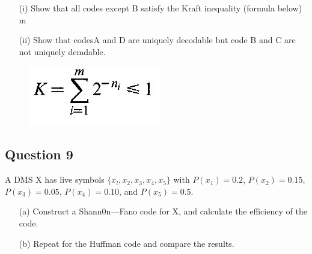 \documentclass[a4paper,12pt]{article}
\begin{document}
\begin{itemize}
\item[(i)] Show that all codes except B satisfy the Kraft inequality (formula below)
m
\item[(ii)] Show that codesA and D are uniquely decodable but code B and C are not
uniquely demdable.
\end{itemize}
\begin{figure}[h!]
\centering
\includegraphics[width=0.4\linewidth]{./12AKraftIneq}
\caption{}
\label{fig:12AKraftIneq}
\end{figure}


\subsection*{Question 9}
A DMS X has live symbols $\{x_l,x_2,x_3,x_4,x_5\}$ with $P(x_1) = 0.2$, $P(x_2)=0.15$, $P(x_3) =0.05$,
$P(x_4) = 0.10$, and $P(x_5) = 0.5$. 
\begin{itemize}
\item[(a)] Construct a Shann0n—Fano code for X, and calculate the efficiency of the code.
\item[(b)] Repeat for the Huffman code and compare the results.
\end{itemize}

 
\end{document}
